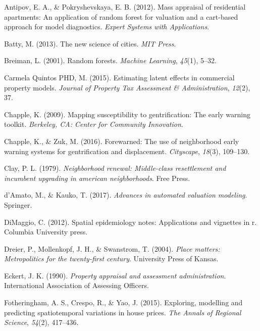 \documentclass[12pt,]{article}
\begin{document}
\leavevmode\hypertarget{ref-antipov12}{}%
Antipov, E. A., \& Pokryshevskaya, E. B. (2012). Mass appraisal of
residential apartments: An application of random forest for valuation
and a cart-based approach for model diagnostics. \emph{Expert Systems
with Applications}.

\leavevmode\hypertarget{ref-Batty2013}{}%
Batty, M. (2013). The new science of cities. \emph{MIT Press}.

\leavevmode\hypertarget{ref-breiman2001random}{}%
Breiman, L. (2001). Random forests. \emph{Machine Learning},
\emph{45}(1), 5--32.

\leavevmode\hypertarget{ref-Quintos2013}{}%
Carmela Quintos PHD, M. (2015). Estimating latent effects in commercial
property models. \emph{Journal of Property Tax Assessment \&
Administration}, \emph{12}(2), 37.

\leavevmode\hypertarget{ref-Chapple2009}{}%
Chapple, K. (2009). Mapping susceptibility to gentrification: The early
warning toolkit. \emph{Berkeley, CA: Center for Community Innovation}.

\leavevmode\hypertarget{ref-Chapple2016}{}%
Chapple, K., \& Zuk, M. (2016). Forewarned: The use of neighborhood
early warning systems for gentrification and displacement.
\emph{Cityscape}, \emph{18}(3), 109--130.

\leavevmode\hypertarget{ref-Clay1979}{}%
Clay, P. L. (1979). \emph{Neighborhood renewal: Middle-class
resettlement and incumbent upgrading in american neighborhoods}. Free
Press.

\leavevmode\hypertarget{ref-Springer2017}{}%
d'Amato, M., \& Kauko, T. (2017). \emph{Advances in automated valuation
modeling}. Springer.

\leavevmode\hypertarget{ref-dimaggio2012spatial}{}%
DiMaggio, C. (2012). Spatial epidemiology notes: Applications and
vignettes in r. Columbia University press.

\leavevmode\hypertarget{ref-Dreier2004}{}%
Dreier, P., Mollenkopf, J. H., \& Swanstrom, T. (2004). \emph{Place
matters: Metropolitics for the twenty-first century}. University Press
of Kansas.

\leavevmode\hypertarget{ref-Eckert1990}{}%
Eckert, J. K. (1990). \emph{Property appraisal and assessment
administration}. International Association of Assessing Officers.

\leavevmode\hypertarget{ref-Fotheringham2015}{}%
Fotheringham, A. S., Crespo, R., \& Yao, J. (2015). Exploring, modelling
and predicting spatiotemporal variations in house prices. \emph{The
Annals of Regional Science}, \emph{54}(2), 417--436.
\end{document}
